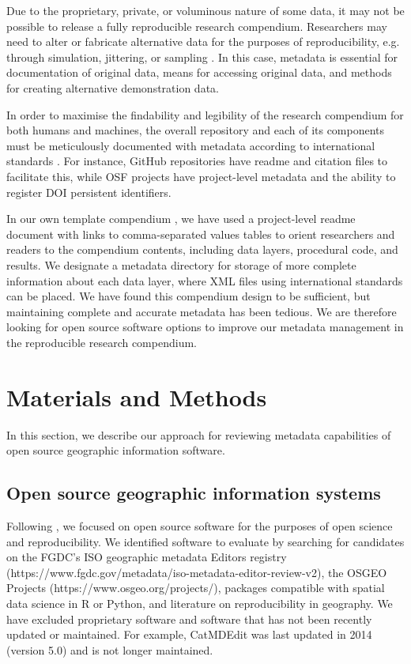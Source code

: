 \documentclass{isprs} %
\begin{document}
Due to the proprietary, private, or voluminous nature of some data, it may not be possible to release a fully reproducible research compendium.
Researchers may need to alter or fabricate alternative data for the purposes of reproducibility, e.g. through simulation, jittering, or sampling \citep{Tullis2021,Singleton2016}. 
In this case, metadata is essential for documentation of original data, means for accessing original data, and methods for creating alternative demonstration data.

In order to maximise the findability and legibility of the research compendium for both humans and machines, the overall repository and each of its components must be meticulously documented with metadata according to international standards \citep{Wilkinson2016,Wilson2021}.
For instance, GitHub repositories have readme and citation files to facilitate this, while OSF projects have project-level metadata and the ability to register DOI persistent identifiers.

In our own template compendium \citep{Kedron_Holler_2022}, we have used a project-level readme document with links to comma-separated values tables to orient researchers and readers to the compendium contents, including data layers, procedural code, and results.
We designate a metadata directory for storage of more complete information about each data layer, where XML files using international standards can be placed.
We have found this compendium design to be sufficient, but maintaining complete and accurate metadata has been tedious.
We are therefore looking for open source software options to improve our metadata management in the reproducible research compendium.

\section{Materials and Methods}\label{methods}

In this section, we describe our approach for reviewing metadata capabilities of open source geographic information software.

\subsection{Open source geographic information systems}\label{software}

Following \citet{Singleton2016}, we focused on open source software for the purposes of open science and reproducibility.
We identified software to evaluate by searching for candidates on the FGDC's ISO geographic metadata Editors registry (https://www.fgdc.gov/metadata/iso-metadata-editor-review-v2), the OSGEO Projects (https://www.osgeo.org/projects/), packages compatible with spatial data science in R or Python, and literature on reproducibility in geography.
We have excluded proprietary software and software that has not been recently updated or maintained. 
For example, CatMDEdit was last updated in 2014 (version 5.0) and is not longer maintained. 
\end{document}
